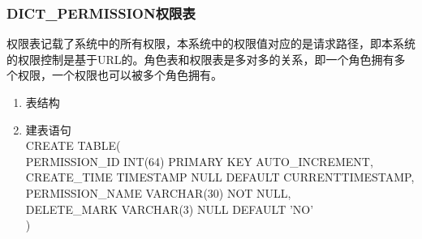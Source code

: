 \subsubsection{DICT\_PERMISSION权限表}
权限表记载了系统中的所有权限，本系统中的权限值对应的是请求路径，即本系统的权限控制是基于URL的。角色表和权限表是多对多的关系，即一个角色拥有多个权限，一个权限也可以被多个角色拥有。
\begin{enumerate}
    \item 表结构
    \begin{table}[htbp]
        \centering
        \end{table}
    \item 建表语句\\
        CREATE TABLE(\\
            PERMISSION\_ID INT(64) PRIMARY KEY AUTO\_INCREMENT,\\
            CREATE\_TIME TIMESTAMP NULL DEFAULT CURRENTTIMESTAMP,\\
            PERMISSION\_NAME VARCHAR(30) NOT NULL,\\
            DELETE\_MARK VARCHAR(3) NULL DEFAULT 'NO'\\
        )
    \end{enumerate}

